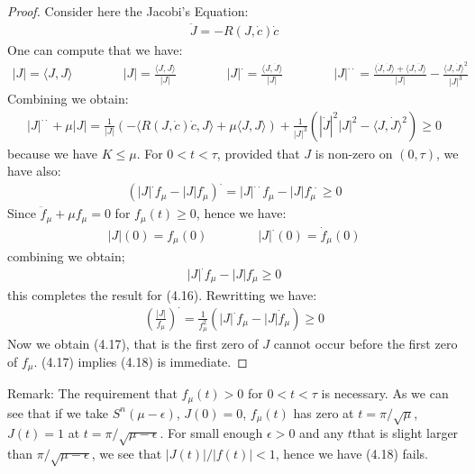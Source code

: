 \documentclass[11pt]{book}
\theoremstyle{break}
\theoremstyle{break}
\newcommand{\remark}{\color{blue}Remark: \color{black}}
\begin{document}
\begin{proof}
Consider here the Jacobi's Equation:
\begin{align*}
\ddot{J} = -R(J, \dot{c}) \dot{c}
\end{align*}
One can compute that we have:
\begin{align*}
|J| = \langle J , J \rangle \qquad \qquad |J| = \frac{\langle J, J\rangle}{|J|} \qquad\qquad
|J|^{\cdot}= \frac{\langle J, \dot{J} \rangle}{|J|}\qquad\qquad |J|^{\cdot\cdot} = \frac{\langle \dot{J},\dot{J}\rangle + \langle J, \ddot{J}\rangle}{|J|} - \frac{\langle J, \dot{J}\rangle^2}{|J|^3}
\end{align*}
Combining we obtain:
\begin{align*}
|J|^{\cdot\cdot}+ \mu |J| = \frac{1}{|J|}\left( -\langle R(J, \dot{c}) \dot{c}, J \rangle + \mu \langle J, J \rangle \right) + \frac{1}{|J|^3}\left( |\dot{J}|^2 |J|^2 - \langle J, \dot{J}\rangle^2 \right) \geq 0
\end{align*}
because we have $K\leq \mu$. For $0< t < \tau$, provided that $J$ is non-zero on $(0,\tau)$, we have also:
\begin{align*}
\left( |J|^{\cdot} f_\mu - |J| f_\mu^{\cdot}\right)^{\cdot} = |J|^{\cdot\cdot} f_\mu - |J|f_{\mu}^{\cdot\cdot} \geq 0
\end{align*}
Since $\ddot{f}_\mu + \mu f_\mu =0$ for $f_\mu(t) \geq 0$, hence we have:
\begin{align*}
|J|(0) = f_\mu (0) \qquad\qquad |J|^{\cdot}(0) = \dot{f}_\mu (0)
\end{align*}
combining we obtain;
\begin{align*}
|J|^{\cdot}f_\mu  - |J|f_\mu^{\cdot} \geq 0
\end{align*}
this completes the result for (4.16). Rewritting we have:
\begin{align*}
\left( \frac{|J|}{f_\mu}\right)^{\cdot} = \frac{1}{f_\mu^2} \left( |J|^{\cdot}f_\mu - |J|\dot{f}_\mu \right)\geq 0
\end{align*}
Now we obtain (4.17), that is the first zero of $J$ cannot occur before the first zero of $f_\mu$. (4.17) implies (4.18) is immediate. 
\end{proof}


\remark The requirement that $f_\mu(t) >0$ for $0< t< \tau$ is necessary. As we can see that if we take $S^n(\mu - \epsilon)$, $J(0) = 0$, $f_\mu(t) $ has zero at $t = \pi/\sqrt{\mu}$, $J(t) = 1$ at $t = \pi/\sqrt{\mu -\epsilon}$. For small enough $\epsilon>0$ and any $t$that is slight larger than $\pi/\sqrt{\mu -\epsilon}$, we see that $|J(t)|/|f(t)| < 1$, hence we have (4.18) fails. 
\end{document}
